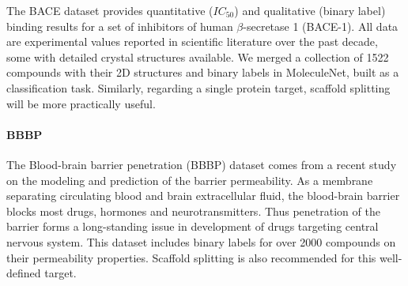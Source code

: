 The BACE dataset provides quantitative ($IC_{50}$) and qualitative (binary label) binding results for a set of inhibitors of human $\beta$-secretase 1 (BACE-1)\cite{BACE-1}. All data are experimental values reported in scientific literature over the past decade, some with detailed crystal structures available. We merged a collection of 1522 compounds with their 2D structures and binary labels in MoleculeNet, built as a classification task. Similarly, regarding a single protein target, scaffold splitting will be more practically useful.

\paragraph{BBBP}

The Blood-brain barrier penetration (BBBP) dataset comes from a recent study\cite{BBBP} on the modeling and prediction of the barrier permeability. As a membrane separating circulating blood and brain extracellular fluid, the blood-brain barrier blocks most drugs, hormones and neurotransmitters. Thus penetration of the barrier forms a long-standing issue in development of drugs targeting central nervous system. This dataset includes binary labels for over 2000 compounds on their permeability properties. Scaffold splitting is also recommended for this well-defined target.

